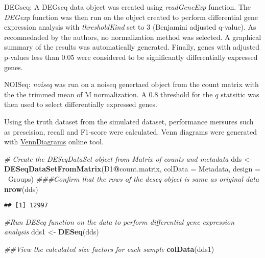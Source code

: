 \documentclass[]{article}
\newenvironment{Shaded}{\begin{snugshade}}{\end{snugshade}}
\newcommand{\CommentTok}[1]{\textcolor[rgb]{0.56,0.35,0.01}{\textit{#1}}}
\newcommand{\DataTypeTok}[1]{\textcolor[rgb]{0.13,0.29,0.53}{#1}}
\newcommand{\KeywordTok}[1]{\textcolor[rgb]{0.13,0.29,0.53}{\textbf{#1}}}
\newcommand{\NormalTok}[1]{#1}
\newcommand{\OperatorTok}[1]{\textcolor[rgb]{0.81,0.36,0.00}{\textbf{#1}}}
\newcommand{\StringTok}[1]{\textcolor[rgb]{0.31,0.60,0.02}{#1}}
\begin{document}
DEGseq: A DEGseq data object was created using \emph{readGeneExp}
function. The \emph{DEGexp} function was then run on the object created
to perform differential gene expression analysis with
\emph{thresholdKind} set to 3 (Benjamini adjusted q-value). As
recomnedaded by the authors, no normalization method was selected. A
graphical summary of the results was automatically generated. Finally,
genes with adjusted p-values less than 0.05 were considered to be
significantly differentially expressed genes.

NOISeq: \emph{noiseq} was run on a noiseq genertaed object from the
count matrix with the the trimmed mean of M normalization. A 0.8
threshold for the \(q\) statsitic was then used to select differentially
expressed genes.

Using the truth dataset from the simulated dataset, performance mersures
such as prescision, recall and F1-score were calculated. Venn diagrams
were generated with
\href{http://bioinformatics.psb.ugent.be/webtools/Venn/}{VennDiagrams}
online tool.

\begin{Shaded}
\begin{Highlighting}[]
\CommentTok{# Create the DESeqDataSet object from Matrix of counts and metadata}
\NormalTok{dds <-}\StringTok{ }\KeywordTok{DESeqDataSetFromMatrix}\NormalTok{(D1}\OperatorTok{@}\NormalTok{count.matrix, }
                              \DataTypeTok{colData =}\NormalTok{ Metadata, }
                              \DataTypeTok{design =} \OperatorTok{~}\NormalTok{Groups)}
\CommentTok{###Confirm that the rows of the deseq object is same as original data}
\KeywordTok{nrow}\NormalTok{(dds) }
\end{Highlighting}
\end{Shaded}

\begin{verbatim}
## [1] 12997
\end{verbatim}

\begin{Shaded}
\begin{Highlighting}[]
\CommentTok{#Run DESeq function on the data to perform differential gene expression analysis}
\NormalTok{dds1 <-}\StringTok{ }\KeywordTok{DESeq}\NormalTok{(dds)}

\CommentTok{##View the calculated size factors for each sample}
\KeywordTok{colData}\NormalTok{(dds1)}
\end{Highlighting}
\end{Shaded}
\end{document}
